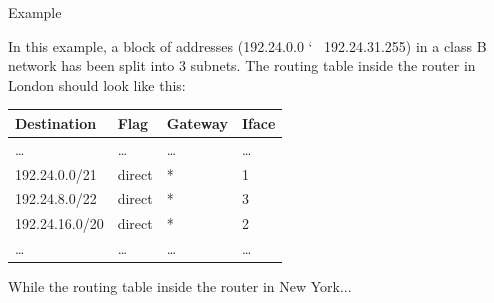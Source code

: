 \begin{frame}{Example}
{}
\end{frame}

In this example, a block of addresses (192.24.0.0 \char`~ 192.24.31.255) in a class B
network has been split into 3 subnets. The routing table inside the router in London
should look like this:
\begin{center}
  \begin{tabular}{llll}\toprule
    Destination&Flag&Gateway&Iface\\\midrule
    \ldots&\ldots&\ldots&\ldots\\
    192.24.0.0/21&direct&*&1\\
    192.24.8.0/22&direct&*&3\\
    192.24.16.0/20&direct&*&2\\
    \ldots&\ldots&\ldots&\ldots\\
  \end{tabular}
\end{center}

While the routing table inside the router in New York...

